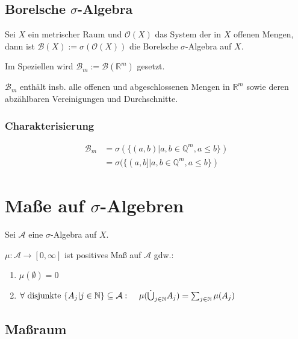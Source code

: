 \subsection*{Borelsche $\sigma$-Algebra}

Sei $X$ ein metrischer Raum und $\mathcal{O}(X)$ das System der in $X$ offenen Mengen, dann ist $\mathcal{B}(X) := \sigma(\mathcal{O}(X))$ die Borelsche $\sigma$-Algebra auf $X$.

Im Speziellen wird $\mathcal{B}_m := \mathcal{B}(\mathbb{R}^m)$ gesetzt.

$\mathcal{B}_m$ enthält insb. alle offenen und abgeschlossenen Mengen in $\mathbb{R}^m$ sowie deren abzählbaren Vereinigungen und Durchschnitte.

\subsubsection*{Charakterisierung}

\vspace*{-4mm}
\begin{align*}
	\mathcal{B}_m &= \sigma(\{(a, b) | a, b \in \mathbb{Q}^m, a \leq b\}) \\
	              &= \sigma(\{(a, b] | a, b \in \mathbb{Q}^m, a \leq b\})
\end{align*}

\section*{Maße auf $\sigma$-Algebren}

Sei $\mathcal{A}$ eine $\sigma$-Algebra auf $X$.

$\mu : \mathcal{A} \rightarrow [0, \infty]$ ist positives Maß auf $\mathcal{A}$ gdw.:

\begin{enumerate}[label=(\alph*)]
	\item $\mu(\emptyset) = 0$
	\item $\forall \text{ disjunkte } \{A_j | j \in \mathbb{N}\} \subseteq \mathcal{A} :\\ \hspace*{4mm} \mu(\dot\bigcup_{j\in \mathbb{N}} A_j) = \sum_{j\in \mathbb{N}} \mu(A_j)$
\end{enumerate}

\subsection*{Maßraum}

